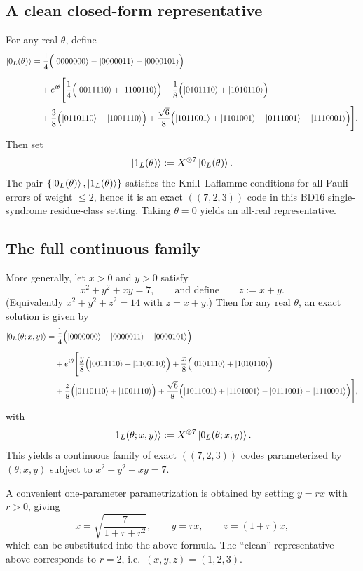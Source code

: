 \documentclass[11pt]{article}
\begin{document}
\subsection{A clean closed-form representative}
For any real \(\theta\), define
\begin{align*}
\ket{0_L(\theta)}
=&\;\frac14\Bigl(\ket{0000000}-\ket{0000011}-\ket{0000101}\Bigr)\\[2mm]
&+e^{i\theta}\Biggl[
\frac14\Bigl(\ket{0011110}+\ket{1100110}\Bigr)
+\frac18\Bigl(\ket{0101110}+\ket{1010110}\Bigr)\\
&
+\frac38\Bigl(\ket{0110110}+\ket{1001110}\Bigr)
+\frac{\sqrt6}{8}\Bigl(\ket{1011001}+\ket{1101001}-\ket{0111001}-\ket{1110001}\Bigr)
\Biggr].
\end{align*}
Then set
\[
\ket{1_L(\theta)}:=X^{\otimes 7}\ket{0_L(\theta)}.
\]
The pair \(\{\ket{0_L(\theta)},\ket{1_L(\theta)}\}\) satisfies the Knill--Laflamme conditions for all Pauli errors of weight \(\le 2\),
hence it is an exact \(((7,2,3))\) code in this BD16 single-syndrome residue-class setting.  Taking \(\theta=0\) yields an
all-real representative.

\subsection{The full continuous family}
More generally, let \(x>0\) and \(y>0\) satisfy
\[
x^2+y^2+xy=7,
\qquad\text{and define}\qquad
z:=x+y.
\]
(Equivalently \(x^2+y^2+z^2=14\) with \(z=x+y\).)
Then for any real \(\theta\), an exact solution is given by
\begin{align*}
\ket{0_L(\theta;x,y)}
=&\;\frac14\Bigl(\ket{0000000}-\ket{0000011}-\ket{0000101}\Bigr)\\[2mm]
&+e^{i\theta}\Biggl[
\frac{y}{8}\Bigl(\ket{0011110}+\ket{1100110}\Bigr)
+\frac{x}{8}\Bigl(\ket{0101110}+\ket{1010110}\Bigr)\\
&
+\frac{z}{8}\Bigl(\ket{0110110}+\ket{1001110}\Bigr)
+\frac{\sqrt6}{8}\Bigl(\ket{1011001}+\ket{1101001}-\ket{0111001}-\ket{1110001}\Bigr)
\Biggr],
\end{align*}
with
\[
\ket{1_L(\theta;x,y)}:=X^{\otimes 7}\ket{0_L(\theta;x,y)}.
\]
This yields a continuous family of exact \(((7,2,3))\) codes parameterized by \((\theta;x,y)\) subject to \(x^2+y^2+xy=7\).

A convenient one-parameter parametrization is obtained by setting \(y=r x\) with \(r>0\), giving
\[
x=\sqrt{\frac{7}{1+r+r^2}},\qquad y=r x,\qquad z=(1+r)x,
\]
which can be substituted into the above formula. The ``clean'' representative above corresponds to \(r=2\), i.e.\
\((x,y,z)=(1,2,3)\).
\end{document}
